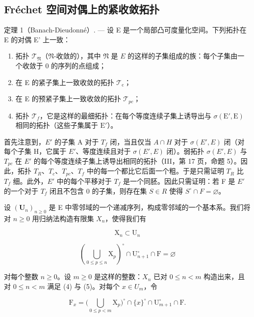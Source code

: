 \subsection{Fréchet 空间对偶上的紧收敛拓扑}

定理 1（Banach-Dieudonné）. --- 设 E 是一个局部凸可度量化空间。下列拓扑在 E 的对偶 E' 上一致：

\begin{enumerate}
\def\labelenumi{\alph{enumi})}
\item
  拓扑 \(\mathcal{T}_{\mathfrak{N}}\)（\(\mathfrak{N}\)-收敛的），其中 \(\mathfrak{N}\) 是 \(E\) 的这样的子集组成的族：每个子集由一个收敛于 0 的序列的点组成；
\item
  在 E 的紧子集上一致收敛的拓扑 \(\mathcal{T}_{\mathrm{c}}\)；
\item
  在 E 的预紧子集上一致收敛的拓扑 \(\mathcal{T}_{pc}\)；
\item
  拓扑 \(\mathcal{T}_f\)，它是这样的最细拓扑：在每个等度连续子集上诱导出与 \(\sigma(\mathrm{E}',\mathrm{E})\) 相同的拓扑（这些子集属于 \(\mathrm{E}'\)）。
\end{enumerate}

首先注意到，\(E'\) 的子集 A 对于 \(T_{f}\) 闭，当且仅当 \(A \cap H\) 对于 \(\sigma(E', E)\) 闭（对每个子集 H，它属于 \(E'\)、等度连续且对于 \(\sigma(E', E)\) 闭）。弱拓扑 \(\sigma(E', E)\) 与 \(T_{pc}\) 在 \(E'\) 的每个等度连续子集上诱导出相同的拓扑（III，第 17 页，命题 5）。因此，拓扑 \(T_{R}\)、\(T_{c}\)、\(T_{pc}\)、\(T_{f}\) 中的每一个都比它后面一个粗。于是只需证明 \(T_{R}\) 比 \(T_{f}\) 细。此外，\(E'\) 中的每个平移对于 \(T_{f}\) 是一个同胚。因此只需证明：若 F 是 \(E'\) 的一个对于 \(T_{f}\) 闭且不包含 0 的子集，则存在集 \(S \in R\) 使得 \(S^{\circ} \cap F = \varnothing\)。

设 \((\mathbf{U}_{n})_{n\geqslant0}\) 是 E 中零邻域的一个递减序列，构成零邻域的一个基本系。我们将对 \(n\geqslant0\) 用归纳法构造有限集 \(X_{n}\)，使得我们有

\[
\mathrm{X} _ {n} \subset \mathrm{U} _ {n}\tag{4}
\]

\[
\left(\bigcup_ {0 \leqslant p \leqslant n} \mathrm{X} _ {p}\right) ^ {\circ} \cap \mathrm{U} _ {n + 1} ^ {\circ} \cap \mathrm{F} = \varnothing\tag{5}
\]

对每个整数 \(n \geqslant 0\)。设 \(m \geqslant 0\) 是这样的整数：\(X_{n}\) 已对 \(0 \leqslant n < m\) 构造出来，且对 \(0 \leqslant n < m\) 满足 (4) 与 (5)。对每个 \(x \in U_{m}\)，令

\[
\mathrm{F} _ {x} = \big (\bigcup_ {0 \leqslant p <   m} \mathrm{X} _ {p} \big) ^ {\circ} \cap \{x \} ^ {\circ} \cap \mathrm{U} _ {m + 1} ^ {\circ} \cap \mathrm{F}.
\]

